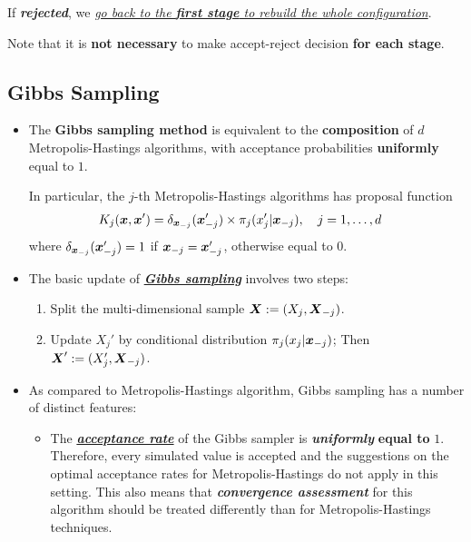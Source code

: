 \documentclass[11pt]{article}
\begin{document}
\begin{itemize}
If \emph{\textbf{rejected}}, we \underline{\emph{go back to the \textbf{first stage} to rebuild the whole configuration}}.

Note that it is \textbf{not necessary} to make accept-reject decision \textbf{for each stage}.
\end{itemize}


\subsection{Gibbs Sampling}
\begin{itemize}
\item \begin{theorem}
The \textbf{Gibbs sampling method} is equivalent to the \textbf{composition} of $d$ Metropolis-Hastings algorithms, with acceptance probabilities \textbf{uniformly} equal to $1$.
\end{theorem} In particular, the $j$-th Metropolis-Hastings algorithms has proposal function
\begin{align}
K_{j}(\boldsymbol{x}, \boldsymbol{x}') &= \delta_{\boldsymbol{x}_{-j}}(\boldsymbol{x}_{-j}')\times \pi_{j}(x_{j}'| \boldsymbol{x}_{-j}), \quad j=1,\ldots, d \label{eqn: gibbs_mh_proposal}
\end{align} where $\delta_{\boldsymbol{x}_{-j}}(\boldsymbol{x}_{-j}') = 1$ if $\boldsymbol{x}_{-j} = \boldsymbol{x}_{-j}'$, otherwise equal to $0$.

\item The basic update of \underline{\emph{\textbf{Gibbs sampling}}} involves two steps:
\begin{enumerate}
\item Split the multi-dimensional sample $\boldsymbol{X} := (X_j, \boldsymbol{X}_{-j})$. 
\item Update $X_j'$ by conditional distribution $\pi_{j}(x_j | \boldsymbol{x}_{-j})$; Then $\boldsymbol{X}' := (X_j', \boldsymbol{X}_{-j})$.
\end{enumerate}

\item As compared to Metropolis-Hastings algorithm, Gibbs sampling has a number of distinct features:
\begin{itemize}
\item The \underline{\emph{\textbf{acceptance rate}}} of the Gibbs sampler is \emph{\textbf{uniformly}} \textbf{equal to} $1$. Therefore, every simulated value is accepted and the suggestions on the optimal acceptance rates for Metropolis-Hastings do not apply in this setting. This also means that \emph{\textbf{convergence assessment}} for this algorithm should be treated differently than for Metropolis-Hastings techniques.



\end{itemize}
\end{itemize}
\end{document}
